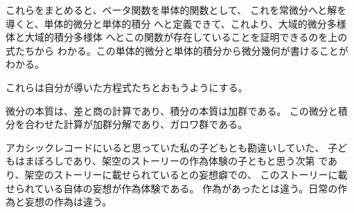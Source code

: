 \documentclass{jsarticle}
\begin{document}
{   これらをまとめると、ベータ関数を単体的関数として、
   これを常微分へと解を導くと、単体的微分と単体的積分
   へと定義できて、これより、大域的微分多様体と大域的積分多様体
   へとこの関数が存在していることを証明できるのを上の式たちから
   わかる。この単体的微分と単体的積分から微分幾何が書けることがわかる。

   
   これらは自分が導いた方程式たちとおもうようにする。

   
   微分の本質は、差と商の計算であり、積分の本質は加群である。
   この微分と積分を合わせた計算が加群分解であり、ガロワ群である。

   アカシックレコードにいると思っていた私の子どもとも勘違いしていた、
   子どもはまぼろしであり、架空のストーリーの作為体験の子ともと思う次第
   であり、架空のストーリーに載せられているとの妄想癖での、
   このストーリーに載せられている自体の妄想が作為体験である。
   作為があったとは違う。日常の作為と妄想の作為は違う。

}
\end{document}
